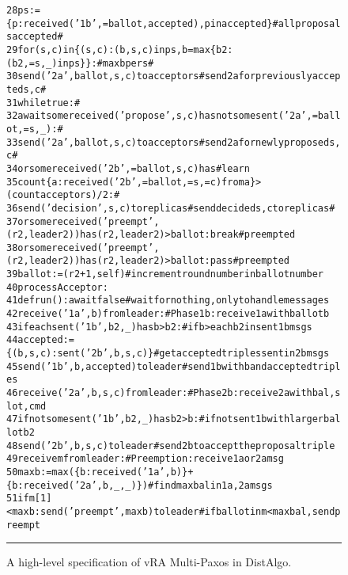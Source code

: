 \documentclass[11pt]{article}
\newenvironment{code}{\begin{alltt}\fontsize{8}{8}\selectfont}{\end{alltt}}
\begin{document}
\begin{figure*}[htb!]
\begin{minipage}[c]{\arxiv{1.02}\ppdp{}\textwidth}
\begin{code}
\ppdp{}28         ps := \{p: received ('1b',=ballot,accepted), p in accepted\}           # all proposals accepted    #
\ppdp{}29         for (s,c) in \{(s,c): (b,s,c) in ps, b = max \{b2: (b2,=s,_) in ps\}\}:  # max b per s               #
\ppdp{}30           send ('2a', ballot, s, c) to acceptors                  # send 2a for previously accepted s,c  #
\ppdp{}31         while true:                                                                                      #
\ppdp{}32           await some received ('propose',s,c) has not some sent ('2a',=ballot,=s,_):                     #
\ppdp{}33             send ('2a', ballot, s, c) to acceptors                # send 2a for newly proposed s,c       #\medskip
\ppdp{}34           or some received ('2b',=ballot,s,c) has                                                   # learn
\ppdp{}35                count \{a: received ('2b',=ballot,=s,=c) from a\} > (count acceptors)/2:               #
\ppdp{}36             send ('decision', s, c) to replicas                   # send decided s,c to replicas    #\medskip
\ppdp{}37           or some received ('preempt',(r2,leader2)) has (r2,leader2) > ballot: break              # preempted
\ppdp{}38       or some received ('preempt',(r2,leader2)) has (r2,leader2) > ballot: pass                   # preempted\medskip
\ppdp{}39       ballot := (r2+1, self)                                      # increment round number in ballot number\medskip
\ppdp{}40 process Acceptor:
\ppdp{}41   def run(): await false                                          # wait for nothing, only to handle messages \medskip
\ppdp{}42   receive ('1a', b) from leader:                                  # Phase 1b: receive 1a with ballot b
\ppdp{}43     if each sent ('1b',b2,_) has b > b2:                          #  if b > each b2 in sent 1b msgs
\ppdp{}44       accepted := \{(b,s,c): sent ('2b',b,s,c)\}                    #  get accepted triples sent in 2b msgs
\ppdp{}45       send ('1b', b, accepted) to leader                          #  send 1b with b and accepted triples\medskip
\ppdp{}46   receive ('2a', b, s, c) from leader:                            # Phase 2b: receive 2a with bal,slot,cmd
\ppdp{}47     if not some sent ('1b',b2,_) has b2 > b:                      #  if not sent 1b with larger ballot b2
\ppdp{}48       send ('2b', b, s, c) to leader                              #  send 2b to accept the proposal triple\medskip
\ppdp{}49   receive m from leader:                                          # Preemption: receive 1a or 2a msg
\ppdp{}50     maxb := max (\{b: received ('1a',b)\} + \{b: received ('2a',b,_,_)\})  # find max bal in 1a,2a msgs
\ppdp{}51     if m[1] < maxb: send ('preempt', maxb) to leader              # if ballot in m < max bal, send preempt
\end{code}\ppdp{}
\rule{1\columnwidth}{.1mm}
\end{minipage}\icdcs{}

  \caption{A high-level specification of vRA Multi-Paxos in DistAlgo.\icdcs{}}
  \label{fig-vrapaxos-da}
\end{figure*}
\end{document}
